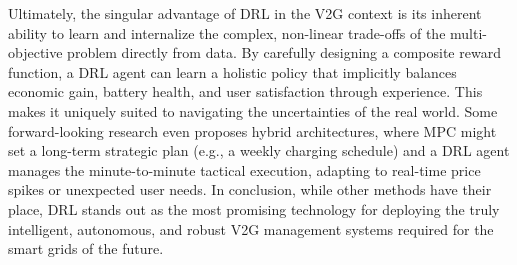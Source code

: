 Ultimately, the singular advantage of DRL in the V2G context is its inherent ability to learn and internalize the complex, non-linear trade-offs of the multi-objective problem directly from data. By carefully designing a composite reward function, a DRL agent can learn a holistic policy that implicitly balances economic gain, battery health, and user satisfaction through experience. This makes it uniquely suited to navigating the uncertainties of the real world. Some forward-looking research even proposes hybrid architectures, where MPC might set a long-term strategic plan (e.g., a weekly charging schedule) and a DRL agent manages the minute-to-minute tactical execution, adapting to real-time price spikes or unexpected user needs. In conclusion, while other methods have their place, DRL stands out as the most promising technology for deploying the truly intelligent, autonomous, and robust V2G management systems required for the smart grids of the future.